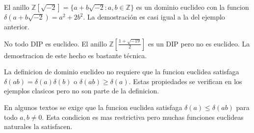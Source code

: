 \begin{example}{}{}
El anillo \(\mathbb{Z}[\sqrt{-2}] = \{a + b\sqrt{-2} : a, b \in \mathbb{Z}\}\) es un dominio euclideo con la funcion \(\delta(a + b\sqrt{-2}) = a^2 + 2b^2\). La demostración es casi igual a la del ejemplo anterior.
\end{example}

\begin{example}{}{}
No todo DIP es euclideo. El anillo \(\mathbb{Z}[\frac{1 + \sqrt{-19}}{2}]\) es un DIP pero no es euclideo. La demostracion de este hecho es bastante técnica.
\end{example}

\begin{remark}
La definicion de dominio euclideo no requiere que la funcion euclidea satisfaga \(\delta(ab) = \delta(a)\delta(b)\) o \(\delta(ab) \geq \delta(a)\). Estas propiedades se verifican en los ejemplos clasicos pero no son parte de la definicion.
\end{remark}

\begin{remark}
En algunos textos se exige que la funcion euclidea satisfaga \(\delta(a) \leq \delta(ab)\) para todo \(a, b \neq 0\). Esta condicion es mas restrictiva pero muchas funciones euclideas naturales la satisfacen.
\end{remark}